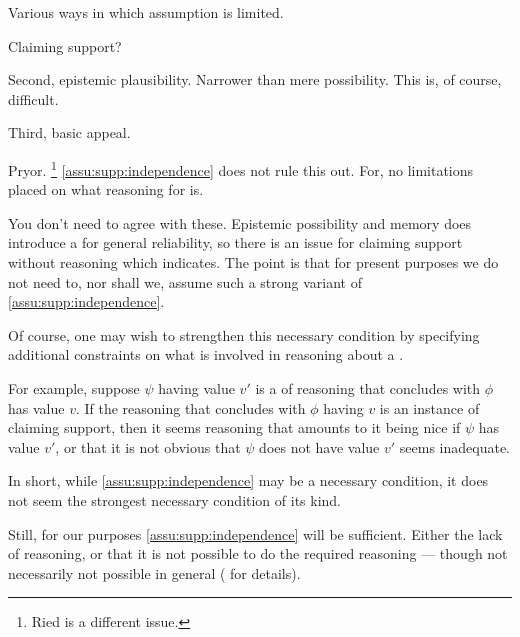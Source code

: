 \begin{note}
  Various ways in which assumption is limited.
\end{note}

\begin{note}
  Claiming support?
\end{note}

\begin{note}
  Second, epistemic plausibility.
  Narrower than mere possibility.
  This is, of course, difficult.
\end{note}

\begin{note}
  Third, basic appeal.

  Pryor.\nolinebreak
  \footnote{
    Ried is a different issue.
  }
  \autoref{assu:supp:independence} does not rule this out.
  For, no limitations placed on what reasoning for \requ{} is.
\end{note}

\begin{note}
  You don't need to agree with these.
  Epistemic possibility and memory does introduce a \requ{} for general reliability, so there is an issue for claiming support without reasoning which indicates.
  The point is that for present purposes we do not need to, nor shall we, assume such a strong variant of \autoref{assu:supp:independence}.
\end{note}

\begin{note}[Strengthen?]
  Of course, one may wish to strengthen this necessary condition by specifying additional constraints on what is involved in reasoning about a \requ{}.

  For example, suppose \(\psi\) having value \(v'\) is a \requ{} of reasoning that concludes with \(\phi\) has value \(v\).
  If the reasoning that concludes with \(\phi\) having \(v\) is an instance of claiming support, then it seems reasoning that amounts to it being nice if \(\psi\) has value \(v'\), or that it is not obvious that \(\psi\) does not have value \(v'\) seems inadequate.

  In short, while \autoref{assu:supp:independence} may be a necessary condition, it does not seem the strongest necessary condition of its kind.

  Still, for our purposes \autoref{assu:supp:independence} will be sufficient.
  Either the lack of reasoning, or that it is not possible to do the required reasoning --- though not necessarily not possible in general (\nI{} for details).
\end{note}

